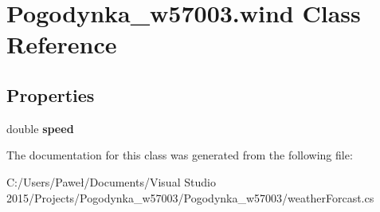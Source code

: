 \hypertarget{class_pogodynka__w57003_1_1wind}{}\section{Pogodynka\+\_\+w57003.\+wind Class Reference}
\label{class_pogodynka__w57003_1_1wind}
\subsection*{Properties}
\begin{DoxyCompactItemize}
\item 
\mbox{\label{class_pogodynka__w57003_1_1wind_a1cd0dc18ac6778b01f7d5d24bcbf22a8}} 
double {\bfseries speed}
\end{DoxyCompactItemize}


The documentation for this class was generated from the following file\+:\begin{DoxyCompactItemize}
\item 
C\+:/\+Users/\+Paweł/\+Documents/\+Visual Studio 2015/\+Projects/\+Pogodynka\+\_\+w57003/\+Pogodynka\+\_\+w57003/weather\+Forcast.\+cs\end{DoxyCompactItemize}
